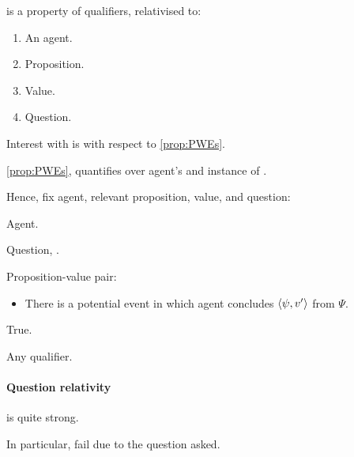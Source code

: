 \begin{note}
  \ptivity{} is a property of qualifiers, relativised to:
  \begin{enumerate}
  \item
    An agent.
  \item
    Proposition.
  \item
    Value.
  \item
    Question.
  \end{enumerate}
\end{note}

\begin{note}
  Interest with \ptivity{} is with respect to \autoref{prop:PWEs}.

  \autoref{prop:PWEs}, quantifies over agent's and instance of \qzS{}.

  Hence, fix agent, relevant proposition, value, and question:

  Agent.

  Question, \qzS{}.

  Proposition-value pair:
  \begin{itemize}
  \item
    There is a potential event in which agent concludes \(\langle \psi, v' \rangle\) from \(\Psi\).
  \end{itemize}

  True.

  Any qualifier.
\end{note}

\paragraph{Question relativity}

\begin{note}
  \ptivity{} is quite strong.

  In particular, fail due to the question asked.
\end{note}

